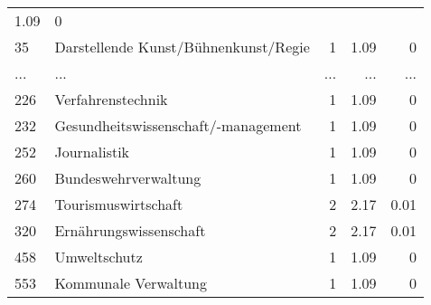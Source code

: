 \begin{longtable}{lXrrr}
          \num[round-mode=places,round-precision=2]{1.09} &
          \num[round-mode=places,round-precision=2]{0} \\
        35 & \multicolumn{1}{X}{Darstellende Kunst/Bühnenkunst/Regie} & %
          \num{1} &
          \num[round-mode=places,round-precision=2]{1.09} &
          \num[round-mode=places,round-precision=2]{0} \\
       ... & ... & ... & ... & ... \\
        226 & \multicolumn{1}{X}{Verfahrenstechnik} & %
          \num{1} &
          \num[round-mode=places,round-precision=2]{1.09} &
          \num[round-mode=places,round-precision=2]{0} \\

        232 & \multicolumn{1}{X}{Gesundheitswissenschaft/-management} & %
          \num{1} &
          \num[round-mode=places,round-precision=2]{1.09} &
          \num[round-mode=places,round-precision=2]{0} \\

        252 & \multicolumn{1}{X}{Journalistik} & %
          \num{1} &
          \num[round-mode=places,round-precision=2]{1.09} &
          \num[round-mode=places,round-precision=2]{0} \\

        260 & \multicolumn{1}{X}{Bundeswehrverwaltung} & %
          \num{1} &
          \num[round-mode=places,round-precision=2]{1.09} &
          \num[round-mode=places,round-precision=2]{0} \\

        274 & \multicolumn{1}{X}{Tourismuswirtschaft} & %
          \num{2} &
          \num[round-mode=places,round-precision=2]{2.17} &
          \num[round-mode=places,round-precision=2]{0.01} \\

        320 & \multicolumn{1}{X}{Ernährungswissenschaft} & %
          \num{2} &
          \num[round-mode=places,round-precision=2]{2.17} &
          \num[round-mode=places,round-precision=2]{0.01} \\

        458 & \multicolumn{1}{X}{Umweltschutz} & %
          \num{1} &
          \num[round-mode=places,round-precision=2]{1.09} &
          \num[round-mode=places,round-precision=2]{0} \\

        553 & \multicolumn{1}{X}{Kommunale Verwaltung} & %
          \num{1} &
          \num[round-mode=places,round-precision=2]{1.09} &
          \num[round-mode=places,round-precision=2]{0} \\


\end{longtable}
